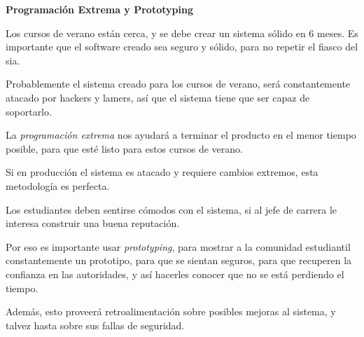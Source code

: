 \textbf{Programación Extrema y Prototyping}

Los cursos de verano están cerca, y se debe crear un sistema sólido en 6 meses. Es importante que el software creado sea seguro y sólido, para no repetir el fiasco del sia.

Probablemente el sistema creado para los cursos de verano, será constantemente atacado por hackers y lamers, así que el sistema tiene que ser capaz de soportarlo.

La \textit{programación extrema} nos ayudará a terminar el producto en el menor tiempo posible, para que esté listo para estos cursos de verano.

Si en producción el sistema es atacado y requiere cambios extremos, esta metodología es perfecta.

Los estudiantes deben sentirse cómodos con el sistema, si al jefe de carrera le interesa construir una buena reputación.

Por eso es importante usar \textit{prototyping}, para mostrar a la comunidad estudiantil constantemente un prototipo, para que se sientan seguros, para que recuperen la confianza en las autoridades, y así hacerles conocer que no se está perdiendo el tiempo.

Además, esto proveerá retroalimentación sobre posibles mejoras al sistema, y talvez hasta sobre sus fallas de seguridad.
